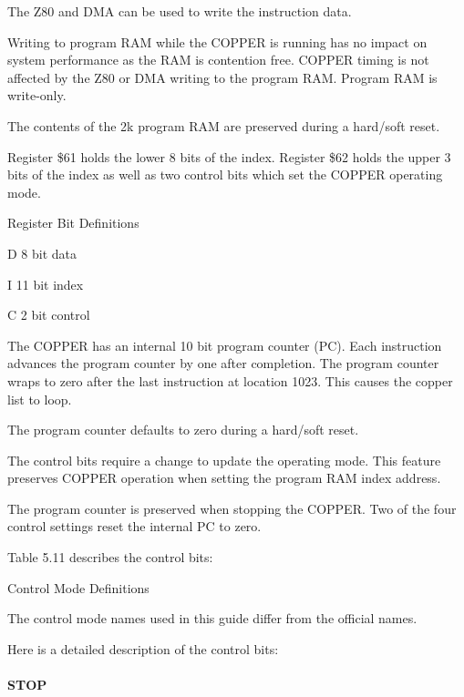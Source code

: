The Z80 and DMA can be used to write the instruction data.

Writing to program RAM while the COPPER is running has no impact on
system performance as the RAM is contention free. COPPER timing is not
affected by the Z80 or DMA writing to the program RAM. Program RAM is
write-only.

The contents of the 2k program RAM are preserved during a hard/soft reset.

Register \$61 holds the lower 8 bits of the index. Register \$62 holds
the upper 3 bits of the index as well as two control bits which set
the COPPER operating mode.

\begin{table}[h]\centering
  \caption{Register Bit Definitions}

  \raggedright D    8 bit data

  I   11 bit index 
  
  C   2 bit control
\end{table}

The COPPER has an internal 10 bit program counter (PC). Each
instruction advances the program counter by one after completion. The
program counter wraps to zero after the last instruction at location
1023. This causes the copper list to loop.

The program counter defaults to zero during a hard/soft reset.

The control bits require a change to update the operating mode. This
feature preserves COPPER operation when setting the program RAM index
address.

The program counter is preserved when stopping the COPPER. Two of the
four control settings reset the internal PC to zero.

Table 5.11 describes the control bits:

\begin{table}[h]\centering
  \caption{Control Mode Definitions}

  \raggedright * The control mode names used in this guide differ from
  the official names.
\end{table}

Here is a detailed description of the control bits:

\paragraph{STOP}

